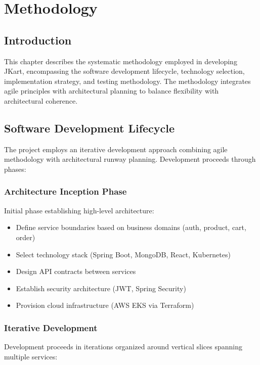 \chapter{Methodology}

\section{Introduction}

This chapter describes the systematic methodology employed in developing JKart, encompassing the software development lifecycle, technology selection, implementation strategy, and testing methodology. The methodology integrates agile principles with architectural planning to balance flexibility with architectural coherence.

\section{Software Development Lifecycle}

The project employs an iterative development approach combining agile methodology with architectural runway planning. Development proceeds through phases:

\subsection{Architecture Inception Phase}

Initial phase establishing high-level architecture:
\begin{itemize}
    \item Define service boundaries based on business domains (auth, product, cart, order)
    \item Select technology stack (Spring Boot, MongoDB, React, Kubernetes)
    \item Design API contracts between services
    \item Establish security architecture (JWT, Spring Security)
    \item Provision cloud infrastructure (AWS EKS via Terraform)
\end{itemize}

\subsection{Iterative Development}

Development proceeds in iterations organized around vertical slices spanning multiple services:

